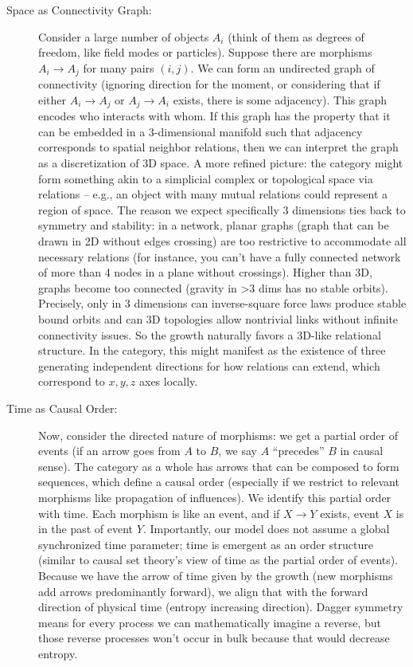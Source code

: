 \documentclass{article}
\begin{document}
\begin{description}
\item[Space as Connectivity Graph:] Consider a large number of objects $A_i$ (think of them as degrees of freedom, like field modes or particles). Suppose there are morphisms $A_i \to A_j$ for many pairs $(i,j)$. We can form an undirected graph of connectivity (ignoring direction for the moment, or considering that if either $A_i\to A_j$ or $A_j\to A_i$ exists, there is some adjacency). This graph encodes who interacts with whom. If this graph has the property that it can be embedded in a 3-dimensional manifold such that adjacency corresponds to spatial neighbor relations, then we can interpret the graph as a discretization of 3D space. A more refined picture: the category might form something akin to a simplicial complex or topological space via relations – e.g., an object with many mutual relations could represent a region of space. The reason we expect specifically 3 dimensions ties back to symmetry and stability: in a network, planar graphs (graph that can be drawn in 2D without edges crossing) are too restrictive to accommodate all necessary relations (for instance, you can’t have a fully connected network of more than 4 nodes in a plane without crossings). Higher than 3D, graphs become too connected (gravity in >3 dims has no stable orbits). Precisely, only in 3 dimensions can inverse-square force laws produce stable bound orbits and can 3D topologies allow nontrivial links without infinite connectivity issues\cite{tegmark1997}. So the growth naturally favors a 3D-like relational structure. In the category, this might manifest as the existence of three generating independent directions for how relations can extend, which correspond to $x,y,z$ axes locally.

\item[Time as Causal Order:] Now, consider the directed nature of morphisms: we get a partial order of events (if an arrow goes from $A$ to $B$, we say $A$ “precedes” $B$ in causal sense). The category as a whole has arrows that can be composed to form sequences, which define a causal order (especially if we restrict to relevant morphisms like propagation of influences). We identify this partial order with time. Each morphism is like an event, and if $X \to Y$ exists, event $X$ is in the past of event $Y$. Importantly, our model does not assume a global synchronized time parameter; time is emergent as an order structure (similar to causal set theory’s view of time as the partial order of events\cite{bombelli1987}). Because we have the arrow of time given by the growth (new morphisms add arrows predominantly forward), we align that with the forward direction of physical time (entropy increasing direction). Dagger symmetry means for every process we can mathematically imagine a reverse, but those reverse processes won’t occur in bulk because that would decrease entropy.


\end{description}
\end{document}
